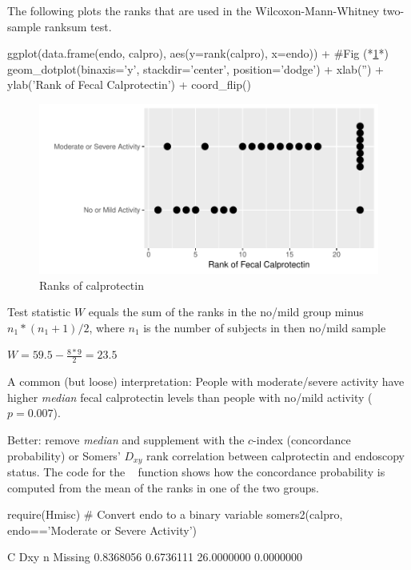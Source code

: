 The following plots the ranks that are used in the
Wilcoxon-Mann-Whitney two-sample ranksum test.
\begin{Schunk}
\begin{Sinput}
ggplot(data.frame(endo, calpro), aes(y=rank(calpro), x=endo)) + #Fig (*\ref{fig:nonpar-calpror}*)
  geom_dotplot(binaxis='y', stackdir='center', position='dodge') +
    xlab('') + ylab('Rank of Fecal Calprotectin') + coord_flip()
\end{Sinput}
\begin{figure}[htbp]

\centerline{\includegraphics[width=\maxwidth]{nonpar-calpror-1} }

\caption[Ranks of calprotectin]{Ranks of calprotectin}\label{fig:nonpar-calpror}
\end{figure}
\end{Schunk}
\bi
\item Test statistic $W$ equals the sum of the ranks in the no/mild group minus $n_1 * (n_1 + 1) / 2$, where $n_1$ is the number of subjects in then no/mild sample
\item $W = 59.5 - \frac{8*9}{2} = 23.5$
\item A common (but loose) interpretation: People with moderate/severe activity have higher \textit{median} fecal calprotectin levels than people with no/mild activity ($p = 0.007$).
\item Better: remove \textit{median} and supplement with the $c$-index
  (concordance probability) or Somers' $D_{xy}$ rank correlation
  between calprotectin and endoscopy status.  The code for the \R\
   function shows how the concordance probability is
  computed from the mean of the ranks in one of the two groups.
\ei
\begin{Schunk}
\begin{Sinput}
require(Hmisc)
# Convert endo to a binary variable
somers2(calpro, endo=='Moderate or Severe Activity')
\end{Sinput}
\begin{Soutput}
         C        Dxy          n    Missing 
 0.8368056  0.6736111 26.0000000  0.0000000 
\end{Soutput}
\end{Schunk}
